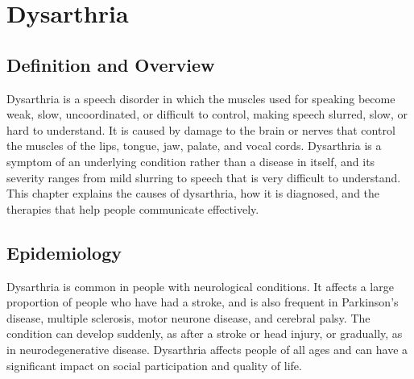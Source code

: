 \chapter{Dysarthria}

\section*{Definition and Overview}
Dysarthria is a speech disorder in which the muscles used for speaking become weak, slow, uncoordinated, or difficult to control, making speech slurred, slow, or hard to understand. It is caused by damage to the brain or nerves that control the muscles of the lips, tongue, jaw, palate, and vocal cords. Dysarthria is a symptom of an underlying condition rather than a disease in itself, and its severity ranges from mild slurring to speech that is very difficult to understand. This chapter explains the causes of dysarthria, how it is diagnosed, and the therapies that help people communicate effectively.

\section*{Epidemiology}
Dysarthria is common in people with neurological conditions. It affects a large proportion of people who have had a stroke, and is also frequent in Parkinson's disease, multiple sclerosis, motor neurone disease, and cerebral palsy. The condition can develop suddenly, as after a stroke or head injury, or gradually, as in neurodegenerative disease. Dysarthria affects people of all ages and can have a significant impact on social participation and quality of life.

